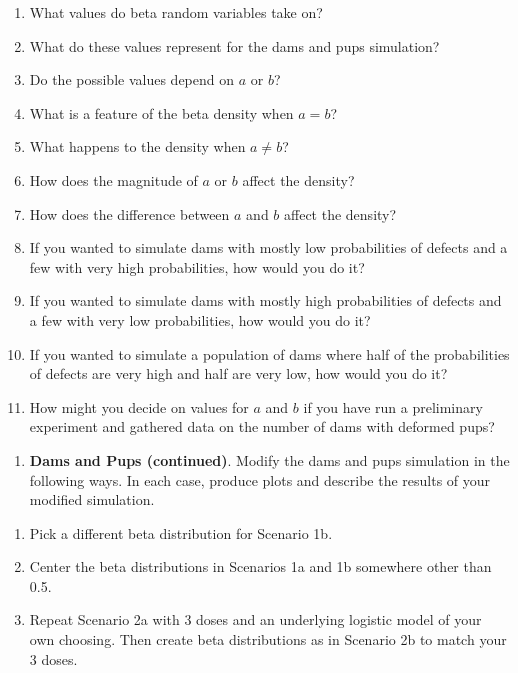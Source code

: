 \documentclass[
]{krantz}
\providecommand{\tightlist}{%
  \setlength{\itemsep}{0pt}\setlength{\parskip}{0pt}}
\begin{document}
\begin{enumerate}
\def\labelenumi{\alph{enumi}.}
\tightlist
\item
  What values do beta random variables take on?
\item
  What do these values represent for the dams and pups simulation?
\item
  Do the possible values depend on \(a\) or \(b\)?
\item
  What is a feature of the beta density when \(a=b\)?
\item
  What happens to the density when \(a \neq b\)?
\item
  How does the magnitude of \(a\) or \(b\) affect the density?
\item
  How does the difference between \(a\) and \(b\) affect the density?
\item
  If you wanted to simulate dams with mostly low probabilities of defects and a few with very high probabilities, how would you do it?
\item
  If you wanted to simulate dams with mostly high probabilities of defects and a few with very low probabilities, how would you do it?
\item
  If you wanted to simulate a population of dams where half of the probabilities of defects are very high and half are very low, how would you do it?
\item
  How might you decide on values for \(a\) and \(b\) if you have run a preliminary experiment and gathered data on the number of dams with deformed pups?
\end{enumerate}

\begin{enumerate}
\def\labelenumi{\arabic{enumi}.}
\setcounter{enumi}{1}
\tightlist
\item
  \textbf{Dams and Pups (continued)}. Modify the dams and pups simulation in the following ways. In each case, produce plots and describe the results of your modified simulation.
\end{enumerate}

\begin{enumerate}
\def\labelenumi{\alph{enumi}.}
\tightlist
\item
  Pick a different beta distribution for Scenario 1b.
\item
  Center the beta distributions in Scenarios 1a and 1b somewhere other than 0.5.
\item
  Repeat Scenario 2a with 3 doses and an underlying logistic model of your own choosing. Then create beta distributions as in Scenario 2b to match your 3 doses.
\end{enumerate}
\end{document}
